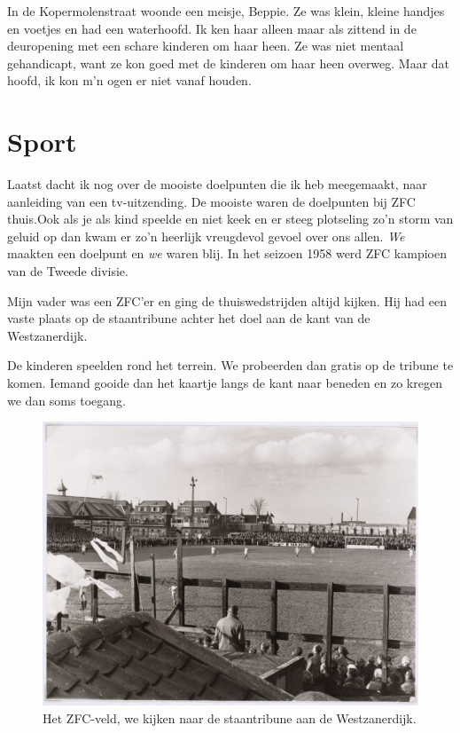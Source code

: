 \documentclass[10pt,twoside, openright]{memoir}
\begin{document}
In de Kopermolenstraat woonde een meisje, Beppie. Ze was klein, kleine handjes en voetjes en had een waterhoofd. Ik ken haar alleen maar als zittend in de deuropening met een schare kinderen om haar heen. Ze was niet mentaal gehandicapt, want ze kon goed met de kinderen om haar heen overweg. Maar dat hoofd, ik kon m’n ogen er niet vanaf houden.

\chapter{Sport} %
\label{cha:sport}

Laatst dacht ik nog over de mooiste doelpunten die ik heb meegemaakt, naar aanleiding van een tv-uitzending. De mooiste waren de doelpunten bij ZFC thuis.Ook als je als kind speelde en niet keek en er steeg plotseling zo’n storm van geluid op dan kwam er zo’n heerlijk vreugdevol gevoel over ons allen. \emph{We} maakten een doelpunt en \emph{we} waren blij. In het seizoen 1958 werd ZFC kampioen van de Tweede divisie.

Mijn vader was een ZFC’er en ging de thuiswedstrijden altijd kijken. Hij had een vaste plaats op de staantribune achter het doel aan de kant van de Westzanerdijk. 

De kinderen speelden rond het terrein. We probeerden dan gratis op de tribune te komen. Iemand gooide dan het kaartje langs de kant naar beneden en zo kregen we dan soms toegang. 

\begin{figure}
\includegraphics[width=\textwidth]{img/74zfc}
\caption*{\footnotesize Het ZFC-veld, we kijken naar de staantribune aan de Westzanerdijk.}
\end{figure}
\end{document}
